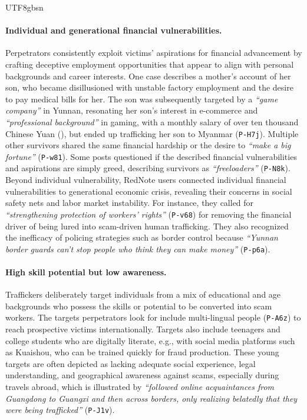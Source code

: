 \documentclass[sigconf,nonacm]{acmart}
\newcommand{\rev}[1]{#1}
\newcommand{\add}[1]{#1}
\begin{document}
\begin{CJK}{UTF8}{gbsn}
\paragraph{\rev{\textbf{Individual and generational financial vulnerabilities.}}}
Perpetrators consistently exploit victims' aspirations for financial advancement by crafting deceptive employment opportunities that appear to align with personal backgrounds and career interests. One case describes a mother's account of her son, who became disillusioned with unstable factory employment and the desire to pay medical bills for her. The son was subsequently targeted by a \textit{``game company''} in Yunnan, resonating her son's interest in e-commerce and \textit{``professional background''} in gaming, with a monthly salary of over ten thousand Chinese Yuan (\textyen), but ended up trafficking her son to Myanmar (\texttt{P-H7j}). Multiple other survivors shared the same financial hardship or the desire to \textit{``make a big fortune''} (\texttt{P-w81}). Some posts questioned if the described financial vulnerabilities and aspirations are simply greed, describing survivors as \textit{``freeloaders''} (\texttt{P-N8k}). \add{Beyond individual vulnerability, RedNote users connected individual financial vulnerabilities to generational economic crisis, revealing their concerns in social safety nets and labor market instability. For instance, they called for \textit{``strengthening protection of workers' rights''} (\texttt{P-v68}) for removing the financial driver of being lured into scam-driven human trafficking. They also recognized the inefficacy of policing strategies such as border control because \textit{``Yunnan border guards can't stop people who think they can make money''} (\texttt{P-p6a}).}

\paragraph{\textbf{High skill potential but low awareness.}} Traffickers deliberately target individuals from a mix of educational and age backgrounds who possess the skills or potential to be converted into scam workers. The targets perpetrators look for include multi-lingual people (\texttt{P-A6z}) to reach prospective victims internationally. Targets also include teenagers and college students who are digitally literate, e.g., with social media platforms such as Kuaishou, who can be trained quickly for fraud production. These young targets are often depicted as lacking adequate social experience, legal understanding, and geographical awareness against scams, especially during travels abroad, which is illustrated by \textit{``followed online acquaintances from Guangdong to Guangxi and then across borders, only realizing belatedly that they were being trafficked''} (\texttt{P-J1v}).


\end{CJK}
\end{document}

